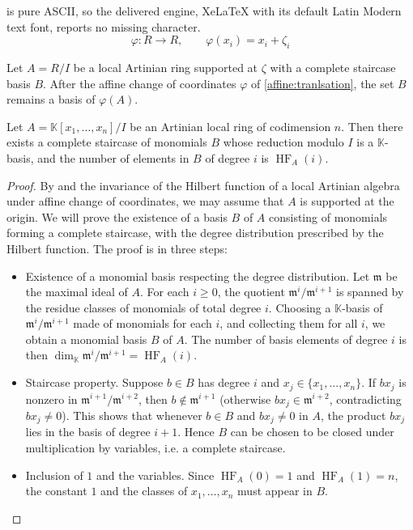 \documentclass[10pt,a4paper]{amsart}
\newcommand{\K}{\mathbb K}
\newenvironment{lemma}{\bigskip \begin{lemma0}}{\end{lemma0}}
\begin{document}
is pure ASCII, so the delivered engine, XeLaTeX with its default Latin Modern text font, reports no missing character.
\begin{equation}\label{affine:tranlsation}
\varphi: R \to R, \qquad \varphi(x_i) = x_i + \zeta_i
\end{equation}

\begin{lemma}\label{base:not:change}
Let $A=R/I$ be a local Artinian ring supported at $\zeta$ with a complete staircase basis $B$. After the affine change of coordinates $\varphi$ of \eqref{affine:tranlsation}, 
 the set $B$ remains a basis of $\varphi(A)$.
\end{lemma}

\begin{lemma}\label{lemma: BasisFromHF}
    Let $A= \K[x_1 , \ldots , x_n]/I$ be an Artinian local ring of codimension $n$. Then there exists a complete staircase of monomials $B$ whose reduction modulo $I$ is a $\K$-basis, and the number of elements in $B$ of degree $i$ is $\operatorname{HF}_A(i)$.
\end{lemma}

\begin{proof}
    By  and the invariance of the Hilbert function of a local Artinian algebra under affine change of coordinates, we may assume that $A$ is supported at the origin.  
    We will prove the existence of a basis $B$ of $A$ consisting of monomials forming a complete staircase, with the degree distribution prescribed by the Hilbert function. The proof is in three steps:

    \begin{itemize}
        \item Existence of a monomial basis respecting the degree distribution.  
        Let $\mathfrak{m}$ be the maximal ideal of $A$. For each $i \ge 0$, the quotient $\mathfrak{m}^i / \mathfrak{m}^{i+1}$ is spanned by the residue classes of monomials of total degree $i$.  
        Choosing a $\K$-basis of $\mathfrak{m}^i / \mathfrak{m}^{i+1}$ made of monomials for each $i$, and collecting them for all $i$, we obtain a monomial basis $B$ of $A$. The number of basis elements of degree $i$ is then $\dim_{\K} \mathfrak{m}^i / \mathfrak{m}^{i+1} = \operatorname{HF}_A(i)$.

        \item Staircase property.  
        Suppose $b \in B$ has degree $i$ and $x_j \in \{x_1,\ldots,x_n\}$. If $b x_j$ is nonzero in $\mathfrak{m}^{i+1}/\mathfrak{m}^{i+2}$, then $b \notin \mathfrak{m}^{i+1}$ (otherwise $b x_j \in \mathfrak{m}^{i+2}$, contradicting $b x_j \neq 0$).  
        This shows that whenever $b \in B$ and $b x_j \neq 0$ in $A$, the product $b x_j$ lies in the basis of degree $i+1$. Hence $B$ can be chosen to be closed under multiplication by variables, i.e. a complete staircase.

        \item Inclusion of $1$ and the variables.
        Since $\operatorname{HF}_A(0) = 1$ and $\operatorname{HF}_A(1) = n$, the constant $1$ and the classes of $x_1,\ldots,x_n$ must appear in $B$.
    \end{itemize}
\end{proof}
\end{document}

